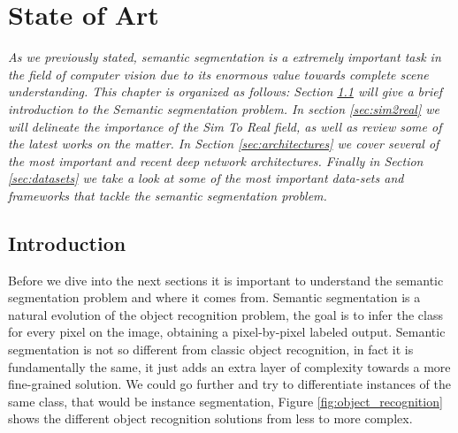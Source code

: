 
\chapter{State of Art}
\label{marcoteorico}
\textit{As we previously stated, semantic segmentation is a extremely important task in the field of computer vision due to its enormous value towards complete scene understanding. This chapter is organized as follows: Section \ref{sec:intro} will give a brief introduction to the Semantic segmentation problem. In section \ref{sec:sim2real} we will delineate the importance of the Sim To Real field, as well as review some of the latest works on the matter. In Section \ref{sec:architectures} we cover several of the most important and recent deep network architectures. Finally in Section \ref{sec:datasets} we take a look at some of the most important data-sets and frameworks that tackle the semantic segmentation problem. }

\section{Introduction}
\label{sec:intro}
Before we dive into the next sections it is important to understand the semantic segmentation problem and where it comes from. Semantic segmentation is a natural evolution of the object recognition problem, the goal is to infer the class for every pixel on the image, obtaining a pixel-by-pixel labeled output. 
Semantic segmentation is not so different from classic object recognition, in fact it is fundamentally the same, it just adds an extra layer of complexity towards a more fine-grained solution. We could go further and try to differentiate instances of the same class, that would be instance segmentation, Figure \ref{fig:object_recognition} shows the different object recognition solutions from less to more complex.

